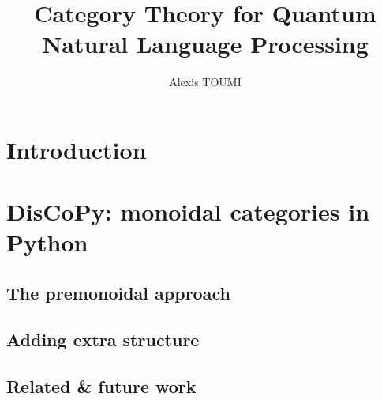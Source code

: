 

\title{Category Theory for Quantum\\
Natural Language Processing}
\author{Alexis TOUMI}

\degreedate{\today}




\begin{romanpages}
\maketitle



\tableofcontents

\end{romanpages}

\chapter*{Introduction}






\chapter{DisCoPy: monoidal categories in Python}






\section{The premonoidal approach} \label{section:premonoidal}

\section{Adding extra structure} \label{section:extra structure}

\section{Related \& future work} \label{section:related and future}

